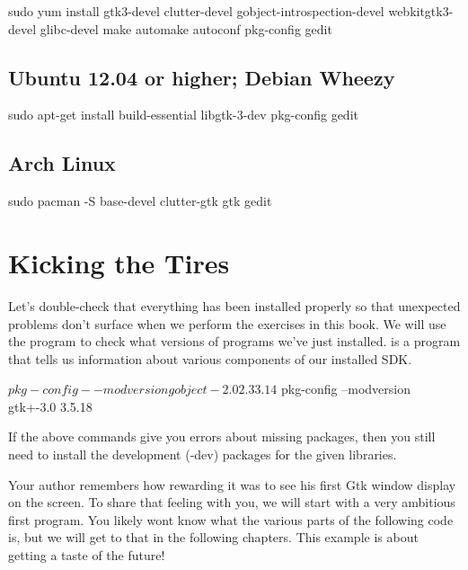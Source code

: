 \begin{Terminal}
sudo yum install gtk3-devel clutter-devel gobject-introspection-devel webkitgtk3-devel glibc-devel make automake autoconf pkg-config gedit
\end{Terminal}


\subsection{Ubuntu 12.04 or higher; Debian Wheezy}

\begin{Terminal}
sudo apt-get install build-essential libgtk-3-dev pkg-config gedit
\end{Terminal}


\subsection{Arch Linux}
\begin{Terminal}
sudo pacman -S base-devel clutter-gtk gtk gedit
\end{Terminal}

\section{Kicking the Tires}

Let's double-check that everything has been installed properly so that 
unexpected problems don't surface when we perform the exercises in this book.
We will use the  program to check what versions of programs
we've just installed.  is a program that tells us information
about various components of our installed SDK.

\begin{Terminal}
$ pkg-config --modversion gobject-2.0
2.33.14

$ pkg-config --modversion gtk+-3.0
3.5.18
\end{Terminal}

If the above commands give you errors about missing packages, then you still
need to install the development (-dev) packages for the given libraries.

Your author remembers how rewarding it was to see his first Gtk window display
on the screen. To share that feeling with you, we will start with a very
ambitious first program. You likely wont know what the various parts of the
following code is, but we will get to that in the following chapters. This
example is about getting a taste of the future!

